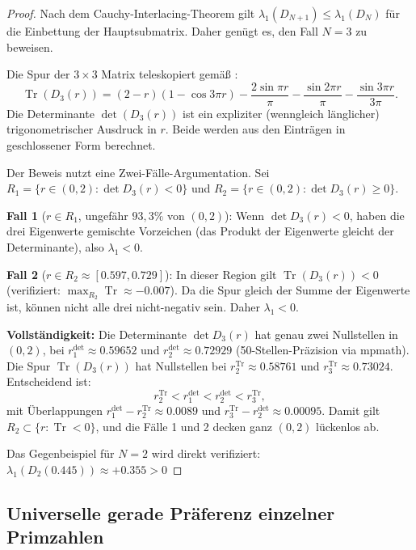\documentclass[12pt,a4paper]{article}
\theoremstyle{definition}
\theoremstyle{remark}
\begin{document}
\begin{proof}
Nach dem Cauchy-Interlacing-Theorem gilt $\lambda_1(D_{N+1}) \leq \lambda_1(D_N)$ für die Einbettung der Hauptsubmatrix. Daher genügt es, den Fall $N = 3$ zu beweisen.

Die Spur der $3 \times 3$ Matrix teleskopiert gemäß :
\[
  \operatorname{Tr}(D_3(r)) = (2-r)(1 - \cos 3\pi r) - \frac{2\sin\pi r}{\pi} - \frac{\sin 2\pi r}{\pi} - \frac{\sin 3\pi r}{3\pi}.
\]
Die Determinante $\det(D_3(r))$ ist ein expliziter (wenngleich länglicher) trigonometrischer Ausdruck in $r$. Beide werden aus den Einträgen in geschlossener Form berechnet.

Der Beweis nutzt eine Zwei-Fälle-Argumentation. Sei $R_1 = \{r \in (0,2) : \det D_3(r) < 0\}$ und $R_2 = \{r \in (0,2) : \det D_3(r) \geq 0\}$.

\medskip
\noindent\textbf{Fall 1} ($r \in R_1$, ungefähr $93{,}3\%$ von $(0,2)$):
Wenn $\det D_3(r) < 0$, haben die drei Eigenwerte gemischte Vorzeichen (das Produkt der Eigenwerte gleicht der Determinante), also $\lambda_1 < 0$.

\medskip
\noindent\textbf{Fall 2} ($r \in R_2 \approx [0.597, 0.729]$):
In dieser Region gilt $\operatorname{Tr}(D_3(r)) < 0$ (verifiziert: $\max_{R_2}\operatorname{Tr} \approx -0.007$). Da die Spur gleich der Summe der Eigenwerte ist, können nicht alle drei nicht-negativ sein. Daher $\lambda_1 < 0$.

\medskip
\noindent\textbf{Vollständigkeit:}
Die Determinante $\det D_3(r)$ hat genau zwei Nullstellen in $(0,2)$, bei $r_1^{\det} \approx 0.59652$ und $r_2^{\det} \approx 0.72929$ (50-Stellen-Präzision via mpmath). Die Spur $\operatorname{Tr}(D_3(r))$ hat Nullstellen bei $r_2^{\operatorname{Tr}} \approx 0.58761$ und $r_3^{\operatorname{Tr}} \approx 0.73024$. Entscheidend ist:
\[
  r_2^{\operatorname{Tr}} < r_1^{\det} < r_2^{\det} < r_3^{\operatorname{Tr}},
\]
mit Überlappungen $r_1^{\det} - r_2^{\operatorname{Tr}} \approx 0.0089$ und $r_3^{\operatorname{Tr}} - r_2^{\det} \approx 0.00095$.
Damit gilt $R_2 \subset \{r : \operatorname{Tr} < 0\}$, und die Fälle 1 und 2 decken ganz $(0,2)$ lückenlos ab.

Das Gegenbeispiel für $N = 2$ wird direkt verifiziert: $\lambda_1(D_2(0.445)) \approx +0.355 > 0$
\end{proof}

\subsection{Universelle gerade Präferenz einzelner Primzahlen}
\end{document}
